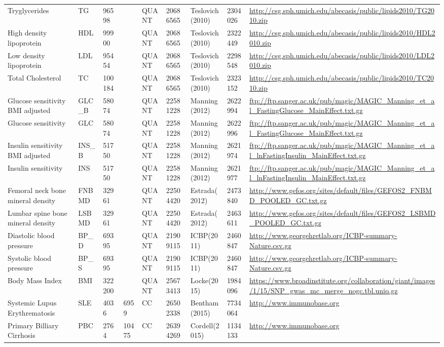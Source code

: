 \begin{center}
\begin{longtable}{| L{5cm} | C{1.5cm} | C{1cm} | C{1.5cm} | C{1.5cm} | C{1.5cm} | L{2.5cm} | R{1.5cm} | L{4cm} |}
Tryglycerides & TG & 96598 &  & QUANT & 20686565 & Teslovich(2010) & 2304026  & \url{http://csg.sph.umich.edu/abecasis/public/lipids2010/TG2010.zip} \\
High density lipoprotein & HDL & 99900 &  & QUANT & 20686565 & Teslovich(2010) & 2322449  & \url{http://csg.sph.umich.edu/abecasis/public/lipids2010/HDL2010.zip} \\
Low density lipoprotein & LDL & 95454 &  & QUANT & 20686565 & Teslovich(2010) & 2298548  & \url{http://csg.sph.umich.edu/abecasis/public/lipids2010/LDL2010.zip} \\
Total Cholesterol & TC & 100184 &  & QUANT & 20686565 & Teslovich(2010) & 2323152  & \url{http://csg.sph.umich.edu/abecasis/public/lipids2010/TC2010.zip} \\
Glucose sensitivity BMI adjusted & GLC\_B & 58074 &  & QUANT & 22581228 & Manning(2012) & 2622994  & \url{ftp://ftp.sanger.ac.uk/pub/magic/MAGIC\_Manning\_et\_al\_FastingGlucose\_MainEffect.txt.gz} \\
Glucose sensitivity & GLC & 58074 &  & QUANT & 22581228 & Manning(2012) & 2622996  & \url{ftp://ftp.sanger.ac.uk/pub/magic/MAGIC\_Manning\_et\_al\_FastingGlucose\_MainEffect.txt.gz} \\
Insulin sensitivity BMI adjusted & INS\_B & 51750 &  & QUANT & 22581228 & Manning(2012) & 2621974  & \url{ftp://ftp.sanger.ac.uk/pub/magic/MAGIC\_Manning\_et\_al\_lnFastingInsulin\_MainEffect.txt.gz} \\
Insulin sensitivity & INS & 51750 &  & QUANT & 22581228 & Manning(2012) & 2621977  & \url{ftp://ftp.sanger.ac.uk/pub/magic/MAGIC\_Manning\_et\_al\_lnFastingInsulin\_MainEffect.txt.gz} \\
Femoral neck bone mineral density & FNBMD & 32961 &  & QUANT & 22504420 & Estrada(2012) & 2473840  & \url{http://www.gefos.org/sites/default/files/GEFOS2\_FNBMD\_POOLED\_GC.txt.gz} \\
Lumbar spine bone mineral density & LSBMD & 32961 &  & QUANT & 22504420 & Estrada(2012) & 2463611  & \url{http://www.gefos.org/sites/default/files/GEFOS2\_LSBMD\_POOLED\_GC.txt.gz} \\
Diastolic blood pressure & BP\_D & 69395 &  & QUANT & 21909115 & ICBP(2011) & 2460847  & \url{http://www.georgehretlab.org/ICBP-summary-Nature.csv.gz} \\
Systolic blood pressure & BP\_S & 69395 &  & QUANT & 21909115 & ICBP(2011) & 2460847  & \url{http://www.georgehretlab.org/ICBP-summary-Nature.csv.gz} \\
Body Mass Index & BMI & 322200 &  & QUANT & 25673413 & Locke(2015) & 1984096  & \url{https://www.broadinstitute.org/collaboration/giant/images/1/15/SNP\_gwas\_mc\_merge\_nogc.tbl.uniq.gz} \\
Systemic Lupus Erythrematosis & SLE & 4036 & 6959 & CC & 26502338 & Bentham(2015) & 7734064  & \url{http://www.immunobase.org} \\
Primary Billiary Cirrhosis & PBC & 2764 & 10475 & CC & 26394269 & Cordell(2015) & 1134133  & \url{http://www.immunobase.org} \\
  

\end{longtable}
\end{center}

